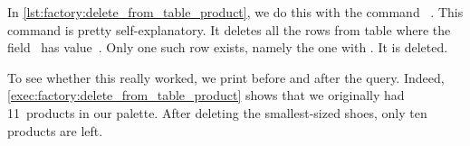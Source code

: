 In \cref{lst:factory:delete_from_table_product}, we do this with the command ~\cite{PGDG:PD:D}.
This command is pretty self-explanatory.
It deletes all the rows from table  where the field~ has value~.
Only one such row exists, namely the one with .
It is deleted.

To see whether this really worked, we print  before and after the  query.
Indeed, \cref{exec:factory:delete_from_table_product} shows that we originally had 11~products in our palette.
After deleting the smallest-sized shoes, only ten products are left.%
%
\endhsection%
\endhsection%
%

